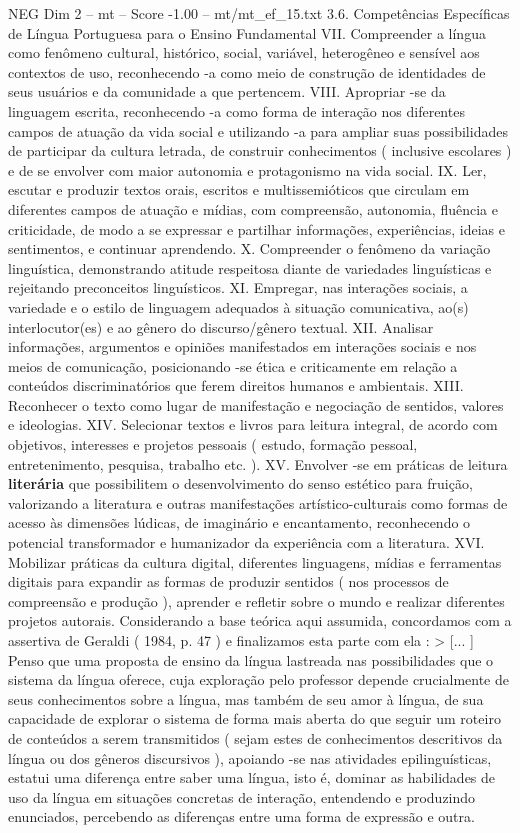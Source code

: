 \begin{textsample}{NEG Dim 2 – mt – Score -1.00 – mt/mt\_ef\_15.txt}  \label{ex:f2_neg_069}
3.6.
Competências Específicas de Língua Portuguesa para o Ensino Fundamental VII.
Compreender a língua como fenômeno cultural, histórico, social, variável, heterogêneo e sensível aos contextos de uso, reconhecendo -a como meio de construção de identidades de seus usuários e da comunidade a que pertencem.
VIII.
Apropriar -se da linguagem escrita, reconhecendo -a como forma de interação nos diferentes campos de atuação da vida social e utilizando -a para ampliar suas possibilidades de participar da cultura letrada, de construir conhecimentos ( inclusive escolares ) e de se envolver com maior autonomia e protagonismo na vida social.
IX.
Ler, escutar e produzir textos orais, escritos e multissemióticos que circulam em diferentes campos de atuação e mídias, com compreensão, autonomia, fluência e criticidade, de modo a se expressar e partilhar informações, experiências, ideias e sentimentos, e continuar aprendendo.
X.
Compreender o fenômeno da variação linguística, demonstrando atitude respeitosa diante de variedades linguísticas e rejeitando preconceitos linguísticos.
XI.
Empregar, nas interações sociais, a variedade e o estilo de linguagem adequados à situação comunicativa, ao(s) interlocutor(es) e ao gênero do discurso/gênero textual.
XII.
Analisar informações, argumentos e opiniões manifestados em interações sociais e nos meios de comunicação, posicionando -se ética e criticamente em relação a conteúdos discriminatórios que ferem direitos humanos e ambientais.
XIII.
Reconhecer o texto como lugar de manifestação e negociação de sentidos, valores e ideologias.
XIV.
Selecionar textos e livros para leitura integral, de acordo com objetivos, interesses e projetos pessoais ( estudo, formação pessoal, entretenimento, pesquisa, trabalho etc. ).
XV.
Envolver -se em práticas de leitura \textbf{literária} que possibilitem o desenvolvimento do senso estético para fruição, valorizando a literatura e outras manifestações artístico-culturais como formas de acesso às dimensões lúdicas, de imaginário e encantamento, reconhecendo o potencial transformador e humanizador da experiência com a literatura.
XVI.
Mobilizar práticas da cultura digital, diferentes linguagens, mídias e ferramentas digitais para expandir as formas de produzir sentidos ( nos processos de compreensão e produção ), aprender e refletir sobre o mundo e realizar diferentes projetos autorais.
Considerando a base teórica aqui assumida, concordamos com a assertiva de Geraldi ( 1984, p. 47 ) e finalizamos esta parte com ela : > [... ] Penso que uma proposta de ensino da língua lastreada nas possibilidades que o sistema da língua oferece, cuja exploração pelo professor depende crucialmente de seus conhecimentos sobre a língua, mas também de seu amor à língua, de sua capacidade de explorar o sistema de forma mais aberta do que seguir um roteiro de conteúdos a serem transmitidos ( sejam estes de conhecimentos descritivos da língua ou dos gêneros discursivos ), apoiando -se nas atividades epilinguísticas, estatui uma diferença entre saber uma língua, isto é, dominar as habilidades de uso da língua em situações concretas de interação, entendendo e produzindo enunciados, percebendo as diferenças entre uma forma de expressão e outra.

\end{textsample}
